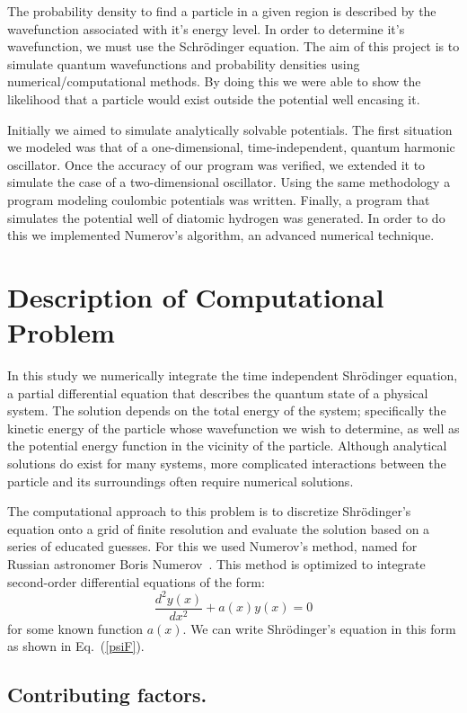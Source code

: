 \documentclass[aps,prl,twocolumn,superscriptaddress]{revtex4-1}
\begin{document}
The probability density to find a particle in a given region is described by the wavefunction associated with it's energy level. In order to determine it's wavefunction, we must use the Schr\"{o}dinger 
equation.  The aim of this project %
is to simulate quantum wavefunctions and probability densities using 
numerical/computational methods.  By doing this we were able to show the likelihood 
that a particle would exist outside the potential well encasing it.


Initially we aimed to simulate analytically solvable potentials.  The first situation we 
modeled was that of a one-dimensional, time-independent, quantum harmonic oscillator.  Once the accuracy of our program was verified, we extended it to simulate the case of a two-dimensional oscillator.  Using 
the same methodology a program modeling coulombic potentials was written.  Finally, a program 
that simulates the potential well of diatomic hydrogen was generated.  In order to do this we 
implemented Numerov's algorithm, an advanced numerical technique.  

\section{Description of Computational Problem}

In this study we numerically integrate the time independent Shr\"{o}dinger equation, a partial differential equation that 
describes the quantum state of a physical system. The solution depends on the total energy of the system; specifically the 
kinetic energy of the particle whose wavefunction we wish to determine, as well as the potential energy function in the 
vicinity of the particle. Although analytical solutions do exist for many systems, more complicated interactions between the 
particle and its surroundings often require numerical solutions. 

The computational approach to this problem is to discretize Shr\"{o}dinger's equation onto a grid of finite resolution and 
evaluate the solution based on a series of educated guesses. For this we used Numerov's method, named for Russian astronomer 
Boris Numerov~\cite{comparison}. This method is optimized to integrate second-order differential equations of the form:
 $$\frac{d^2y(x)}{dx^2}+a(x)y(x) = 0$$
 for some known function $a(x)$. We can write Shr\"{o}dinger's equation in this form as shown in Eq.~(\ref{psiF}).

\subsection{Contributing factors.}
\end{document}
